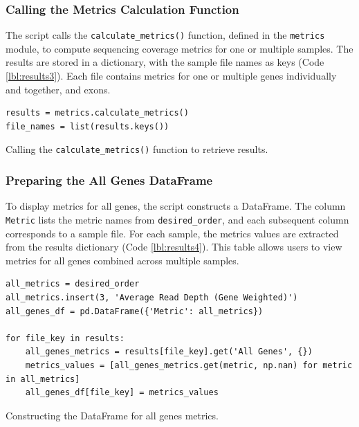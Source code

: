 \subsubsection{\textbf{Calling the Metrics Calculation Function}}

The script calls the \texttt{calculate\_metrics()} function, defined in the \texttt{metrics} module, to compute sequencing coverage metrics for one or multiple samples. The results are stored in a dictionary, with the sample file names as keys (Code \ref{lbl:results3}). Each file contains metrics for one or multiple genes individually and together, and exons.

\begin{longlisting}
\begin{verbatim}
results = metrics.calculate_metrics()
file_names = list(results.keys())
\end{verbatim}
\caption{Calling the \texttt{calculate\_metrics()} function to retrieve results.}
\label{lbl:results3}
\end{longlisting}

\subsubsection{\textbf{Preparing the All Genes DataFrame}}

To display metrics for all genes, the script constructs a DataFrame. The column \texttt{Metric} lists the metric names from \texttt{desired\_order}, and each subsequent column corresponds to a sample file. For each sample, the metrics values are extracted from the results dictionary (Code \ref{lbl:results4}). This table allows users to view metrics for all genes combined across multiple samples.

\begin{longlisting}
\begin{verbatim}
all_metrics = desired_order
all_metrics.insert(3, 'Average Read Depth (Gene Weighted)')
all_genes_df = pd.DataFrame({'Metric': all_metrics})

for file_key in results:
    all_genes_metrics = results[file_key].get('All Genes', {})
    metrics_values = [all_genes_metrics.get(metric, np.nan) for metric in all_metrics]
    all_genes_df[file_key] = metrics_values
\end{verbatim}
\caption{Constructing the DataFrame for all genes metrics.}
\label{lbl:results4}
\end{longlisting}

